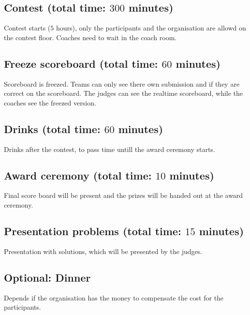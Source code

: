 \subsection{Contest (total time: $300$ minutes)}
Contest starts ($5$ hours), only the participants and the organisation are allowd on the contest floor. Coaches need to wait in the coach room.

\subsection{Freeze scoreboard (total time: $60$ minutes)}
Scoreboard is freezed. Teams can only see there own submission and if they are correct on the scoreboard. The judges can see the realtime scoreboard, while the coaches see the freezed version.

\subsection{Drinks (total time: $60$ minutes)}
Drinks after the contest, to pass time untill the award ceremony starts.

\subsection{Award ceremony (total time: $10$ minutes)}\label{awardCeremony}
Final score board will be present and the prizes will be handed out at the award ceremony.

\subsection{Presentation problems (total time: $15$ minutes)}
Presentation with solutions, which will be presented by the judges.

\subsection{Optional: Dinner}
Depends if the organisation has the money to compensate the cost for the participants.